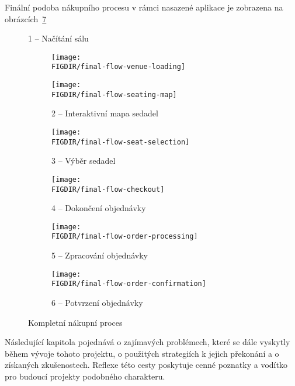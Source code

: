Finální podoba nákupního procesu v rámci nasazené aplikace je zobrazena na obrázcích~\ref{fig:final-flow}

\begin{figure}[p]
    \centering
    \caption{1 – Načítání sálu}
    \hfill
    \begin{subfigure}{0.48\textwidth}
        \texttt{[image: \\FIGDIR/final-flow-venue-loading]}
        \source{}
        \label{fig:final-flow-venue-loading}
    \end{subfigure}
    \hfill
    \begin{subfigure}{0.48\textwidth}
        \texttt{[image: \\FIGDIR/final-flow-seating-map]}
        \caption{2 – Interaktivní mapa sedadel}
        \label{fig:final-flow-seating-map}
    \end{subfigure}
    \hfill
    \begin{subfigure}{0.48\textwidth}
        \texttt{[image: \\FIGDIR/final-flow-seat-selection]}
        \caption{3 – Výběr sedadel}
        \label{fig:final-flow-seat-selection}
    \end{subfigure}
    \hfill
    \begin{subfigure}{0.48\textwidth}
        \texttt{[image: \\FIGDIR/final-flow-checkout]}
        \caption{4 – Dokončení objednávky}
        \label{fig:final-flow-checkout}
    \end{subfigure}
    \hfill
    \begin{subfigure}{0.48\textwidth}
        \texttt{[image: \\FIGDIR/final-flow-order-processing]}
        \caption{5 – Zpracování objednávky}
        \label{fig:final-flow-order-processing}
    \end{subfigure}
    \hfill
    \begin{subfigure}{0.48\textwidth}
        \texttt{[image: \\FIGDIR/final-flow-order-confirmation]}
        \caption{6 – Potvrzení objednávky}
        \label{fig:final-flow-order-confirmation}
    \end{subfigure}
    \caption{Kompletní nákupní proces}
    \label{fig:final-flow}
\end{figure}

Následující kapitola pojednává o zajímavých problémech, které se dále vyskytly během vývoje tohoto projektu, o použitých strategiích k jejich překonání a o získaných zkušenostech.
Reflexe této cesty poskytuje cenné poznatky a vodítko pro budoucí projekty podobného charakteru.
